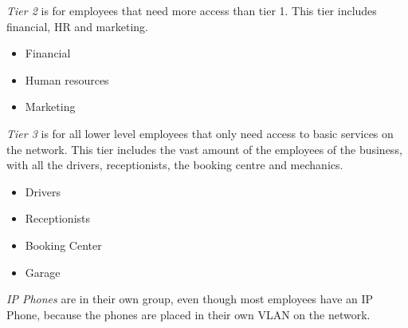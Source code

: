 \hfill

\emph{Tier 2} is for employees that need more access than tier 1. This tier includes financial, HR and marketing.
\begin{itemize}[noitemsep]
    \item Financial
    \item Human resources
    \item Marketing
\end{itemize}

\hfill

\emph{Tier 3} is for all lower level employees that only need access to basic services on the network. This tier includes the vast amount of the employees of the business, with all the drivers, receptionists, the booking centre and mechanics.
\begin{itemize}
    \item Drivers
    \item Receptionists
    \item Booking Center
    \item Garage
\end{itemize}

\emph{IP Phones} are in their own group, even though most employees have an IP Phone, because the phones are placed in their own VLAN on the network.

